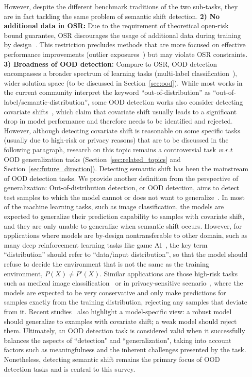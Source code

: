 However, despite the different benchmark traditions of the two sub-tasks, they are in fact tackling the same problem of semantic shift detection.
\noindent\textbf{2) No additional data in OSR:} Due to the requirement of theoretical open-risk bound guarantee, OSR discourages the usage of additional data during training by design~. This restriction precludes methods that are more focused on effective performance improvements (\eg outlier exposures~) but may violate OSR constraints.
\noindent\textbf{3) Broadness of OOD detection:} Compare to OSR, OOD detection encompasses a broader spectrum of learning tasks (\eg multi-label classification~), wider solution space (to be discussed in Section~\ref{sec:ood}).
\smallskip
{}
While most works in the current community interpret the keyword ``out-of-distribution'' as ``out-of-label/semantic-distribution'', some OOD detection works also consider detecting covariate shifts~, which claim that covariate shift usually leads to a significant drop in model performance and therefore needs to be identified and rejected.
However, although detecting covariate shift is reasonable on some specific tasks (usually due to high-risk or privacy reasons) that are to be discussed in the following paragraph, research on this topic remains a controversial task \emph{w.r.t} OOD generalization tasks (\cf Section~\ref{sec:related_topics} and Section~\ref{sec:future_direction}). Detecting semantic shift has been the mainstream of OOD detection tasks.
\smallskip
{}
We provide another definition from the perspective of generalization:
Out-of-distribution detection, or OOD detection, aims to detect test samples to which the model cannot or does not want to generalize~.
In most of the machine learning tasks, such as image classification, the models are expected to generalize their prediction capability to samples with covariate shift, and they are only unable to generalize when semantic shift occurs.
However, for applications where models are by-design nontransferable to other domain, such as many deep reinforcement learning tasks like game AI~, the key term ``distribution'' should refer to ``data/input distribution'', so that the model should refuse to decide the environment that is not the same as the training environment, \ie $P(X)\neq P'(X)$. 
Similar applications are those high-risk tasks such as medical image classification~ or in privacy-sensitive scenario~, where the models are expected to be very conservative and only make predictions for samples exactly from the training distribution, rejecting any samples that deviate from it.
Recent studies~ also highlight a model-specific view: a robust model should generalize to examples with covariate shift; a weak model should reject them.
Ultimately, an OOD detection task is considered valid when it successfully balances the aspects of ``detection" and ``generalization", taking into account factors such as meaningfulness and the inherent challenges presented by the task. Nonetheless, detecting semantic shift remains the primary focus of OOD detection tasks and is central to this survey.

